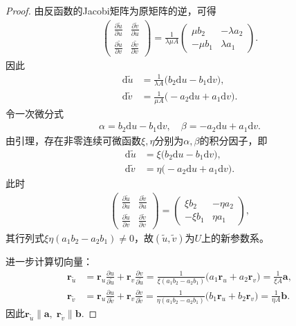 \documentclass[../../main.tex]{subfiles}%
\begin{document}
\begin{proof}
由反函数的Jacobi矩阵为原矩阵的逆，可得
\begin{align}
\begin{pmatrix}
\frac{\partial\tilde u}{\partial u}&\frac{\partial\tilde v}{\partial u}\\
\frac{\partial\tilde u}{\partial v}&\frac{\partial\tilde v}{\partial v}
\end{pmatrix}
=\frac{1}{\lambda\mu A}\begin{pmatrix}
\mu b_2&-\lambda a_2\\
-\mu b_1&\lambda a_1
\end{pmatrix}.
\label{eq:jacobiinv}
\end{align}
因此
\begin{align}
\mathrm{d}\tilde u&=\frac{1}{\lambda A}\big(b_2\mathrm{d}u - b_1\mathrm{d}v\big),\nonumber\\
\mathrm{d}\tilde v&=\frac{1}{\mu A}\big(-a_2\mathrm{d}u + a_1\mathrm{d}v\big).
\label{eq:diffformtildeuv}
\end{align}
令一次微分式
\begin{align*}
\alpha = b_2\mathrm{d}u - b_1\mathrm{d}v,\quad \beta = -a_2\mathrm{d}u + a_1\mathrm{d}v.
\end{align*}
由引理，存在非零连续可微函数$\xi,\eta$分别为$\alpha,\beta$的积分因子，即
\begin{align}
\mathrm{d}\tilde u &= \xi\big(b_2\mathrm{d}u - b_1\mathrm{d}v\big),\nonumber\\
\mathrm{d}\tilde v &= \eta\big(-a_2\mathrm{d}u + a_1\mathrm{d}v\big).
\label{eq:intfactordiff}
\end{align}
此时
\begin{align*}
\begin{pmatrix}
\frac{\partial\tilde u}{\partial u}&\frac{\partial\tilde v}{\partial u}\\
\frac{\partial\tilde u}{\partial v}&\frac{\partial\tilde v}{\partial v}
\end{pmatrix}
=\begin{pmatrix}
\xi b_2&-\eta a_2\\
-\xi b_1&\eta a_1
\end{pmatrix},
\end{align*}
其行列式$\xi\eta(a_1b_2-a_2b_1)\neq0$，故$(\tilde u,\tilde v)$为$U$上的新参数系。

进一步计算切向量：
\begin{align*}
\bm r_{\tilde u}&=\bm r_u\frac{\partial u}{\partial\tilde u}+\bm r_v\frac{\partial v}{\partial\tilde u}
=\frac{1}{\xi(a_1b_2-a_2b_1)}\big(a_1\bm r_u+a_2\bm r_v\big)
=\frac{1}{\xi A}\bm a,\\
\bm r_{\tilde v}&=\bm r_u\frac{\partial u}{\partial\tilde v}+\bm r_v\frac{\partial v}{\partial\tilde v}
=\frac{1}{\eta(a_1b_2-a_2b_1)}\big(b_1\bm r_u+b_2\bm r_v\big)
=\frac{1}{\eta A}\bm b.
\end{align*}
因此$\bm r_{\tilde u}\parallel\bm a,\;\bm r_{\tilde v}\parallel\bm b$.

\end{proof}
\end{document}
